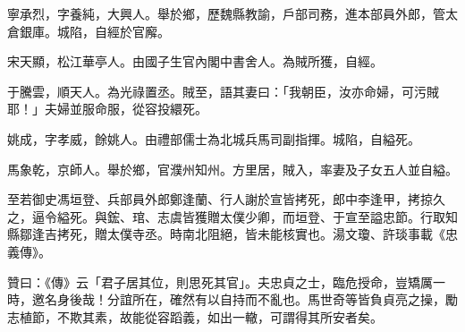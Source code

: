 \begin{pinyinscope}
寧承烈，字養純，大興人。舉於鄉，歷魏縣教諭，戶部司務，進本部員外郎，管太倉銀庫。城陷，自經於官廨。

宋天顯，松江華亭人。由國子生官內閣中書舍人。為賊所獲，自經。

于騰雲，順天人。為光祿置丞。賊至，語其妻曰：「我朝臣，汝亦命婦，可污賊耶！」夫婦並服命服，從容投繯死。

姚成，字孝威，餘姚人。由禮部儒士為北城兵馬司副指揮。城陷，自縊死。

馬象乾，京師人。舉於鄉，官濮州知州。方里居，賊入，率妻及子女五人並自縊。

至若御史馮垣登、兵部員外郎鄭逢蘭、行人謝於宣皆拷死，郎中李逢甲，拷掠久之，逼令縊死。與鋐、琯、志虞皆獲贈太僕少卿，而垣登、于宣至謚忠節。行取知縣鄒逢吉拷死，贈太僕寺丞。時南北阻絕，皆未能核實也。湯文瓊、許琰事載《忠義傳》。

贊曰：《傳》云「君子居其位，則思死其官」。夫忠貞之士，臨危授命，豈矯厲一時，邀名身後哉！分誼所在，確然有以自持而不亂也。馬世奇等皆負貞亮之操，勵志植節，不欺其素，故能從容蹈義，如出一轍，可謂得其所安者矣。


\end{pinyinscope}